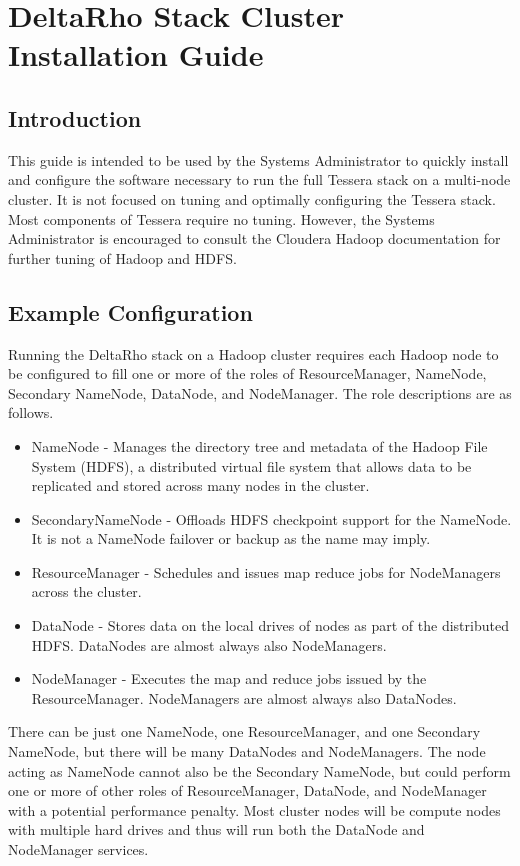 \section{DeltaRho Stack Cluster Installation Guide}
\subsection{Introduction}
This guide is intended to be used by the Systems Administrator to quickly
install and configure the software necessary to run the full Tessera
stack on a multi-node cluster.  It is not focused on tuning and optimally
configuring the Tessera stack.  Most components of Tessera require no
tuning.  However, the Systems Administrator is encouraged to consult the
Cloudera Hadoop documentation for further tuning of Hadoop and HDFS.

\subsection{Example Configuration}
Running the DeltaRho stack on a Hadoop cluster requires each Hadoop node
to be configured to fill one or more of the roles of ResourceManager,
NameNode, Secondary NameNode, DataNode, and NodeManager. The role
descriptions are as follows.

\begin{itemize}
\item NameNode - Manages the directory tree and metadata of the Hadoop File System (HDFS), a distributed virtual file system that allows data to be replicated and stored across many nodes in the cluster.
\item SecondaryNameNode - Offloads HDFS checkpoint support for the NameNode.  It is not a NameNode failover or backup as the name may imply.
\item ResourceManager - Schedules and issues map reduce jobs for NodeManagers across the cluster.
\item DataNode - Stores data on the local drives of nodes as part of the distributed HDFS.  DataNodes are almost always also NodeManagers.
\item NodeManager - Executes the map and reduce jobs issued by the ResourceManager. NodeManagers are almost always also DataNodes.
\end{itemize}

There can be just one NameNode, one ResourceManager, and one Secondary
NameNode, but there will be many DataNodes and NodeManagers.  The node
acting as NameNode cannot also be the Secondary NameNode, but could
perform one or more of other roles of ResourceManager, DataNode, and
NodeManager with a potential  performance penalty.  Most cluster nodes
will be compute nodes with multiple hard drives and thus will run both
the DataNode and NodeManager services.


